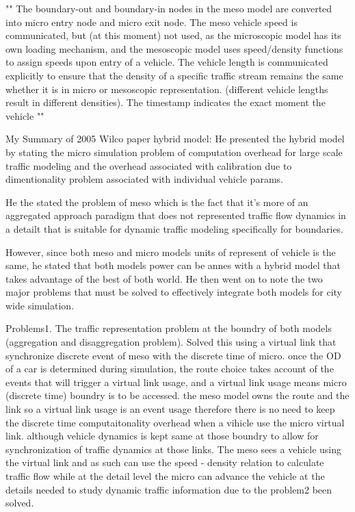 \begin{bibunit}[plainnat]
""
The boundary-out and boundary-in nodes in the meso model
are converted into micro entry node and micro exit node. The meso vehicle speed
is communicated, but (at this moment) not used, as the microscopic model has its
own loading mechanism, and the mesoscopic model uses speed/density functions
to assign speeds upon entry of a vehicle. The vehicle length is communicated
explicitly to ensure that the density of a specific traffic stream remains the same
whether it is in micro or mesoscopic representation. (different vehicle lengths result
in different densities). The timestamp indicates the exact moment the vehicle
""

My Summary of 2005 Wilco paper hybrid model:
He presented the hybrid model by stating the micro simulation problem of computation overhead for large scale 
traffic modeling and the overhead associated with calibration due to dimentionality problem associated with individual 
vehicle params. 

He the stated the problem of meso which is the fact that it's more of an aggregated approach paradigm that does not represented 
traffic flow dynamics in a detailt that is suitable for dynamic traffic modeling specifically for boundaries. 


However, since both meso and micro models units of represent of vehicle is the same, he stated that both models power 
can be annes with a hybrid model that takes advantage of the best of both world. He then went on to note the two major problems 
that must be solved to effectively integrate both models for city wide simulation. 

Problems1. The traffic representation problem at the boundry of both models (aggregation and disaggregation problem). Solved this using a virtual link that synchronize 
discrete event of meso with the discrete time of micro. once the OD of a car is determined during simulation, the route choice 
takes account of the events that will trigger a virtual link usage, and a virtual link usage means micro (discrete time) boundry
is to be accessed. the meso model owns the route and the link so a virtual link usage is an event usage therefore there is no 
need to keep the discrete time computaitonality overhead when a  vihicle use the micro virtual link. although vehicle dynamics is 
kept same at those boundry to allow for synchronization of traffic dynamics at those links. The meso sees a vehicle using the virtual link and 
as such can use the speed - density relation to calculate traffic flow while at the detail level the micro can advance the vehicle 
at the details needed to study dynamic traffic information due to the problem2 been solved. 


\end{bibunit}
